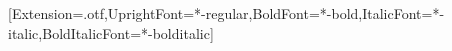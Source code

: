 \usepackage{graphicx}
\usepackage{booktabs}
\usepackage{array}
\usepackage{xurl}
\setmainfont{texgyretermes}[Extension=.otf,UprightFont=*-regular,BoldFont=*-bold,ItalicFont=*-italic,BoldItalicFont=*-bolditalic]
\usepackage{newunicodechar}
\setlength{\emergencystretch}{2em}

\AtBeginDocument{\renewcommand{\theHtable}{\thetable}}

